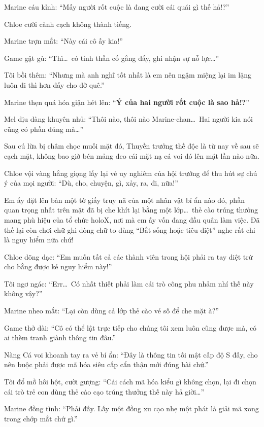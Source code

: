 \documentclass[../main.tex]{subfiles}
\begin{document}
Marine cáu kỉnh: ``Mấy người rốt cuộc là đang cười cái quái gì thế hả!?''

Chloe cười cành cạch không thành tiếng.

Marine trợn mắt: ``Này cái cô ấy kia!''

Game gật gù: ``Thì\dots\ có tinh thần cố gắng đấy, ghi nhận sự nỗ lực\dots''

Tôi bồi thêm: ``Nhưng mà anh nghĩ tốt nhất là em nên ngậm miệng lại im lặng luôn đi thì hơn đấy cho đỡ quê.''

Marine thẹn quá hóa giận hét lên: ``\textbf{Ý của hai người rốt cuộc là sao hả!?}''

Mel dịu dàng khuyên nhủ: ``Thôi nào, thôi nào Marine-chan\dots\ Hai người kia nói cũng có phần đúng mà\dots''

Sau cú lừa bị châm chọc muối mặt đó, Thuyền trưởng thề độc là từ nay về sau sẽ cạch mặt, không bao giờ bén mảng đeo cái mặt nạ cá voi đó lên mặt lần nào nữa.

Chloe vội vàng hắng giọng lấy lại vẻ uy nghiêm của hội trưởng để thu hút sự chú ý của mọi người: ``Dù, cho, chuyện, gì, xảy, ra, đi, nữa!''

Em ấy đặt lên bàn một tờ giấy truy nã của một nhân vật bí ẩn nào đó, phần quan trọng nhất trên mặt đã bị che khít lại bằng một lớp\dots\ thẻ cào trúng thưởng mang phù hiệu của tổ chức holoX, nơi mà em ấy vốn đang đầu quân làm việc. Đã thế lại còn chơi chữ ghi dòng chữ to đùng ``Bắt sống hoặc tiêu diệt'' nghe rất chi là nguy hiểm nữa chứ!


Chloe dõng dạc: ``Em muốn tất cả các thành viên trong hội phải ra tay diệt trừ cho bằng được kẻ nguy hiểm này!''

Tôi ngơ ngác: ``Err\dots\ Có nhất thiết phải làm cái trò công phu nhảm nhí thế này không vậy?''

Marine nheo mắt: ``Lại còn dùng cả lớp thẻ cào vé số để che mặt à?''

Game thở dài: ``Cô có thể lật trực tiếp cho chúng tôi xem luôn cũng được mà, có ai thèm tranh giành thông tin đâu.''

Nàng Cá voi khoanh tay ra vẻ bí ẩn: ``Đây là thông tin tối mật cấp độ S đấy, cho nên buộc phải được mã hóa siêu cấp cẩn thận mới đúng bài chứ.''

Tôi đổ mồ hôi hột, cười gượng: ``Cái cách mã hóa kiểu gì không chọn, lại đi chọn cái trò trẻ con dùng thẻ cào cạo trúng thưởng thế này hả giời\dots''

Marine đồng tình: ``Phải đấy. Lấy một đồng xu cạo nhẹ một phát là giải mã xong trong chớp mắt chứ gì.''
\end{document}
